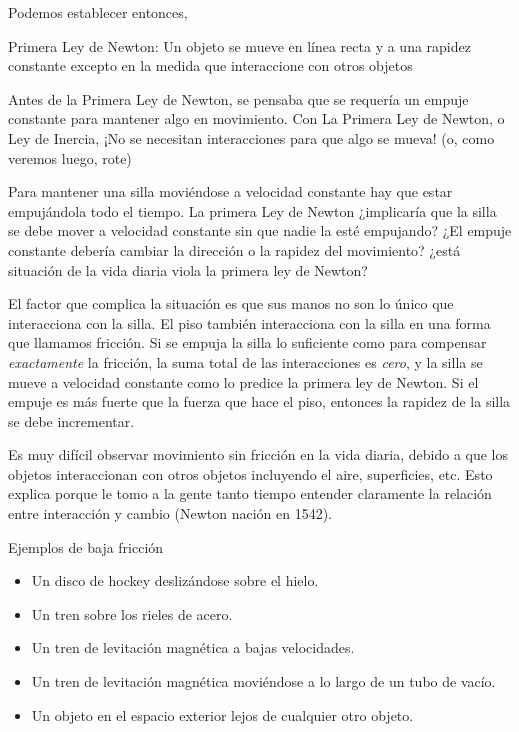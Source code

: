 Podemos establecer entonces,

\begin{frame}
  \begin{block}{Primera Ley de Newton:}
    Un objeto se mueve en línea recta y a una rapidez constante
    excepto en la medida que interaccione con otros objetos
  \end{block}
\end{frame}

Antes de la Primera Ley de Newton,  se pensaba que se requería un empuje constante para mantener algo en movimiento. Con La Primera Ley de Newton, o Ley de Inercia, ¡No se necesitan interacciones para que algo se mueva! (o, como veremos luego, rote)


Para mantener una silla moviéndose a velocidad constante hay que estar empujándola todo el tiempo. La primera Ley de Newton ¿implicaría que la silla se debe mover a velocidad constante sin que nadie la esté empujando? ¿El empuje constante debería cambiar la dirección o la rapidez del movimiento? ¿está situación de la vida diaria viola la primera ley de Newton?

El factor que complica la situación es que sus manos no son lo único
que interacciona con la silla. El piso también interacciona con la
silla en una forma que llamamos fricción. Si se empuja la silla lo
suficiente como para compensar \emph{exactamente} la fricción, la suma
total de las interacciones es \emph{cero}, y la silla se mueve a
velocidad constante como lo predice la primera ley de Newton. Si el
empuje es más fuerte que la fuerza que hace el piso, entonces la
rapidez de la silla se debe incrementar.


Es muy difícil observar movimiento sin fricción en la vida diaria, debido a que los objetos interaccionan con otros objetos incluyendo el aire, superficies, etc. Esto explica porque le tomo a la gente tanto tiempo entender claramente la relación entre interacción y cambio (Newton nación en 1542).

\begin{frame}
Ejemplos de baja fricción
\begin{itemize}
\item Un disco de hockey deslizándose sobre el hielo.
\item Un tren sobre los rieles de acero.
\item Un tren de levitación magnética a bajas velocidades.
\item Un tren de levitación magnética moviéndose a lo largo de un tubo de vacío.
\item Un objeto en el espacio exterior lejos de cualquier otro objeto.
\end{itemize}
\end{frame}

